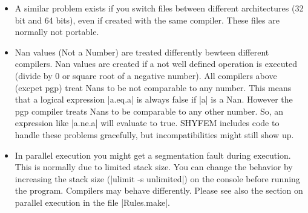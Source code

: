 \begin{itemize}
\item A similar problem exists if you switch files between different
architectures (32 bit and 64 bits), even if created with the same
compiler. These files are normally not portable.

\item Nan values (Not a Number) are treated differently bewteen different
compilers. Nan values are created if a not well defined operation
is executed (divide by 0 or square root of a negative number). All
compilers above (excpet pgp) treat Nans to be not comparable to any
number.  This means that a logical expression |a.eq.a| is always false
if |a| is a Nan. However the pgp compiler treats Nans to be comparable
to any other number. So, an expression like |a.ne.a| will evaluate to
true. SHYFEM includes code to handle these problems gracefully, but
incompatibilities might still show up.

\item In parallel execution you might get a segmentation fault during
execution. This is normally due to limited stack size. You can change
the behavior by increasing the stack size (|ulimit -s unlimited|)
on the console before running the program. Compilers may behave
differently. Please see also the section on parallel execution in the
file |Rules.make|.

\end{itemize}






